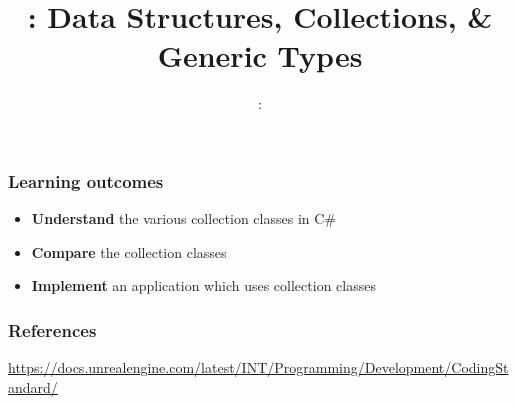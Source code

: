 \usepackage{../../beamerthemeFalmouthGamesAcademy}
\usepackage{multimedia}
\graphicspath{ {../../} }


\usepackage[normalem]{ulem}
\usepackage{wasysym}
\usepackage{listings}
\usepackage{pdfpages}
\usepackage[T1]{fontenc} 

\usetikzlibrary{arrows,automata}




\title{\sessionnumber: Data Structures, Collections, \& Generic Types}
\subtitle{\modulecode: \moduletitle}

\frame{\titlepage}

\begin{frame}
	\frametitle{Learning outcomes}
	\begin{itemize}
		\item \textbf{Understand} the various collection classes in C\#
		\item \textbf{Compare} the collection classes
		\item \textbf{Implement} an application which uses collection classes
	\end{itemize}
\end{frame}










%

\begin{frame}
  \frametitle{References}
  \url{https://docs.unrealengine.com/latest/INT/Programming/Development/CodingStandard/}
\end{frame}



